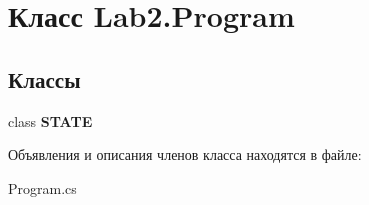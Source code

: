 \hypertarget{class_lab2_1_1_program}{}\section{Класс Lab2.\+Program}
\label{class_lab2_1_1_program}
\subsection*{Классы}
\begin{DoxyCompactItemize}
\item 
class {\bfseries S\+T\+A\+TE}
\end{DoxyCompactItemize}


Объявления и описания членов класса находятся в файле\+:\begin{DoxyCompactItemize}
\item 
Program.\+cs\end{DoxyCompactItemize}
